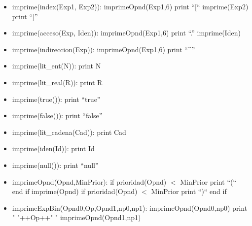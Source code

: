 \documentclass[11pt]{article}
\begin{document}
\begin{itemize}
            \item imprime(index(Exp1, Exp2)):
                \subitem imprimeOpnd(Exp1,6)
                \subitem print “[“
                \subitem imprime(Exp2)
                \subitem print “]”
            
            \item imprime(acceso(Exp, Iden)):
                \subitem imprimeOpnd(Exp1,6)
                \subitem print “.”
                \subitem imprime(Iden)
            
            \item imprime(indireccion(Exp)):
                \subitem imprimeOpnd(Exp1,6)
                \subitem print “\^{}”
            
            \item imprime(lit\_ent(N)):
                \subitem print N
            
            \item imprime(lit\_real(R)):
                \subitem print R
            
            \item imprime(true()):
                \subitem print “true”
            
            \item imprime(false()):
                \subitem print “false”
            
            \item imprime(lit\_cadena(Cad)):
                \subitem print Cad
            
            \item imprime(iden(Id)):
                \subitem print Id
            
            \item imprime(null()):
                \subitem print “null”
                \item imprimeOpnd(Opnd,MinPrior):
                \subitem if prioridad(Opnd) $<$ MinPrior
                    \subsubitem print “(“
                \subitem end if
                \subitem imprime(Opnd)
                \subitem if prioridad(Opnd) $<$ MinPrior
                    \subsubitem print “)“
                \subitem end if
            
            \item imprimeExpBin(Opnd0,Op,Opnd1,np0,np1):
                \subitem imprimeOpnd(Opnd0,np0) 
                \subitem print " "++Op++" " 
                \subitem imprimeOpnd(Opnd1,np1) 
            

\end{itemize}
\end{document}

